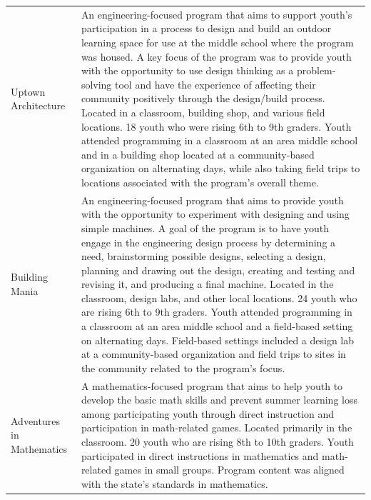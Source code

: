 \documentclass[]{msu-thesis}
\theoremstyle{definition}
\theoremstyle{definition}
\theoremstyle{definition}
\theoremstyle{remark}
\begin{document}
\begin{landscape}
\begin{table}
\begin{tabular}[t]{ll}
Uptown Architecture & An engineering-focused program that aims to support youth's participation in a process to design and build an outdoor learning space for use at the middle school where the program was housed. A key focus of the program was to provide youth with the opportunity to use design thinking as a problem-solving tool and have the experience of affecting their community positively through the design/build process. Located in a classroom, building shop, and various field locations. 18 youth who were rising 6th to 9th graders. Youth attended programming in a classroom at an area middle school and in a building shop located at a community-based organization on alternating days, while also taking field trips to locations associated with the program's overall theme.\\
Building Mania & An engineering-focused program that aims to provide youth with the opportunity to experiment with designing and using simple machines. A goal of the program is to have youth engage in the engineering design process by determining a need, brainstorming possible designs, selecting a design, planning and drawing out the design, creating and testing and revising it, and producing a final machine. Located in the classroom, design labs, and other local locations. 24 youth who are rising 6th to 9th graders. Youth attended programming in a classroom at an area middle school and a field-based setting on alternating days. Field-based settings included a design lab at a community-based organization and field trips to sites in the community related to the program's focus.\\
Adventures in Mathematics & A mathematics-focused program that aims to help youth to develop the basic math skills and prevent summer learning loss among participating youth through direct instruction and participation in math-related games. Located primarily in the classroom. 20 youth who are rising 8th to 10th graders. Youth participated in direct instructions in mathematics and math-related games in small groups. Program content was aligned with the state's standards in mathematics.\\
\bottomrule
\end{tabular}
\end{table}
\end{landscape}
\end{document}
